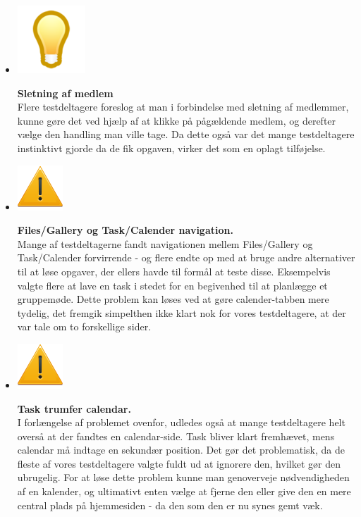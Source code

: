 \documentclass[12pt]{article}
\begin{document}
\begin{itemize}
   \item[]       \begin{minipage}{0.07\linewidth}
  \includegraphics[scale=0.4]{Billeder/ide}
          \end{minipage} \textbf{Sletning af medlem}\\
           Flere testdeltagere foreslog at man i forbindelse med sletning af medlemmer, kunne gøre det ved hjælp af at klikke på pågældende medlem, og derefter vælge den handling man ville tage. Da dette også var det mange testdeltagere instinktivt gjorde da de fik opgaven, virker det som en oplagt tilføjelse.
  
   \item[]       \begin{minipage}{0.07\linewidth}
  \includegraphics[scale=0.4]{Billeder/alvorligt}
          \end{minipage} \textbf{Files/Gallery og Task/Calender navigation.} \\
          Mange af testdeltagerne fandt navigationen mellem Files/Gallery og Task/Calender forvirrende - og flere endte op med at bruge andre alternativer til at løse opgaver, der ellers havde til formål at teste disse. Eksempelvis valgte flere at lave en task i stedet for en begivenhed til at planlægge et gruppemøde. Dette problem kan løses ved at gøre calender-tabben mere tydelig, det fremgik simpelthen ikke klart nok for vores testdeltagere, at der var tale om to forskellige sider.

   \item[]       \begin{minipage}{0.07\linewidth}
  \includegraphics[scale=0.4]{Billeder/alvorligt}
          \end{minipage}\textbf{Task trumfer calendar.}\\ I forlængelse af problemet ovenfor, udledes også at mange testdeltagere helt overså at der fandtes en calendar-side. Task bliver klart fremhævet, mens calendar må indtage en sekundær position. Det gør det problematisk, da de fleste af vores testdeltagere valgte fuldt ud at ignorere den, hvilket gør den ubrugelig. For at løse dette problem kunne man genoverveje nødvendigheden af en kalender, og ultimativt enten vælge at fjerne den eller give den en mere central plads på hjemmesiden - da den som den er nu synes gemt væk.
  

\end{itemize}
\end{document}
